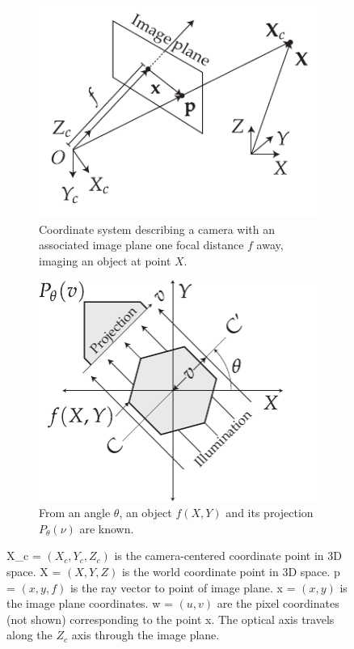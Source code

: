 \documentclass{osa-article}
\begin{document}
\begin{figure}
  \centering
  \begin{subfigure}[t]{0.48\linewidth}
    \centering
    \includegraphics{./figures/coordinate_system}
    \caption[Coordinate system]{Coordinate system describing a camera with an associated image plane one focal distance \(f\) away, imaging an object at point \(X\).
    }\label{fig:coordinate_system_flopt}
  \end{subfigure}\hfill
  \begin{subfigure}[t]{0.48\linewidth}
    \centering
    \includegraphics{./figures/OPT_digram}
    \caption[Principle of OPT]{From an angle \(\theta \), an object \(f(X,Y)\) and its projection \(P_\theta(\nu)\) are known.}\label{fig:OPT_digram}
  \end{subfigure}
  \caption[Coordinates and OPT]{\gls*{X_c} = \((X_c,Y_c,Z_c)\) is the camera-centered coordinate point in 3D space.
    \gls*{X} = \((X,Y,Z)\) is the world coordinate point in 3D space.
    \gls*{p} = \((x,y,f)\) is the ray vector to point of image plane.
    \gls*{x} = \((x,y)\) is the image plane coordinates.
    \gls*{w} = \((u,v)\) are the pixel coordinates (not shown) corresponding to the point \gls*{x}.
    The optical axis travels along the \(Z_c\) axis through the image plane.}
  \label{fig:single-view-coordinates}
\end{figure}
\end{document}

